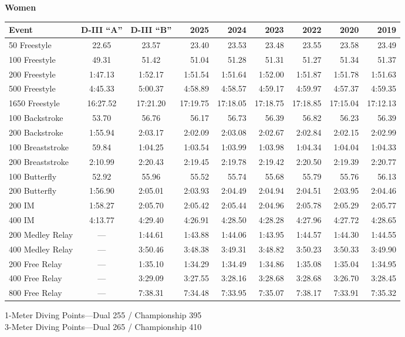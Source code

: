\textbf{Women}
\begin{table}[htbp]
\centering
\scriptsize
\begin{tabularx}{\textwidth}{lccrrrrrr}
\toprule
Event & D-III ``A'' & D-III ``B'' & 2025 & 2024 & 2023 & 2022 & 2020 & 2019 \\
\midrule
50 Freestyle & 22.65 & 23.57 & 23.40 & 23.53 & 23.48 & 23.55 & 23.58 & 23.49 \\
100 Freestyle & 49.31 & 51.42 & 51.04 & 51.28 & 51.31 & 51.27 & 51.34 & 51.37 \\
200 Freestyle & 1:47.13 & 1:52.17 & 1:51.54 & 1:51.64 & 1:52.00 & 1:51.87 & 1:51.78 & 1:51.63 \\
500 Freestyle & 4:45.33 & 5:00.37 & 4:58.89 & 4:58.57 & 4:59.17 & 4:59.97 & 4:57.37 & 4:59.35 \\
1650 Freestyle & 16:27.52 & 17:21.20 & 17:19.75 & 17:18.05 & 17:18.75 & 17:18.85 & 17:15.04 & 17:12.13 \\
100 Backstroke & 53.70 & 56.76 & 56.17 & 56.73 & 56.39 & 56.82 & 56.23 & 56.39 \\
200 Backstroke & 1:55.94 & 2:03.17 & 2:02.09 & 2:03.08 & 2:02.67 & 2:02.84 & 2:02.15 & 2:02.99 \\
100 Breaststroke & 59.84 & 1:04.25 & 1:03.54 & 1:03.99 & 1:03.98 & 1:04.34 & 1:04.04 & 1:04.33 \\
200 Breaststroke & 2:10.99 & 2:20.43 & 2:19.45 & 2:19.78 & 2:19.42 & 2:20.50 & 2:19.39 & 2:20.77 \\
100 Butterfly & 52.92 & 55.96 & 55.52 & 55.74 & 55.68 & 55.79 & 55.76 & 56.13 \\
200 Butterfly & 1:56.90 & 2:05.01 & 2:03.93 & 2:04.49 & 2:04.94 & 2:04.51 & 2:03.95 & 2:04.46 \\
200 IM & 1:58.27 & 2:05.70 & 2:05.42 & 2:05.44 & 2:04.96 & 2:05.78 & 2:05.29 & 2:05.77 \\
400 IM & 4:13.77 & 4:29.40 & 4:26.91 & 4:28.50 & 4:28.28 & 4:27.96 & 4:27.72 & 4:28.65 \\
200 Medley Relay & --- & 1:44.61 & 1:43.88 & 1:44.06 & 1:43.95 & 1:44.57 & 1:44.30 & 1:44.55 \\
400 Medley Relay & --- & 3:50.46 & 3:48.38 & 3:49.31 & 3:48.82 & 3:50.23 & 3:50.33 & 3:49.90 \\
200 Free Relay & --- & 1:35.10 & 1:34.29 & 1:34.49 & 1:34.86 & 1:35.08 & 1:35.04 & 1:34.95 \\
400 Free Relay & --- & 3:29.09 & 3:27.55 & 3:28.16 & 3:28.68 & 3:28.68 & 3:26.70 & 3:28.45 \\
800 Free Relay & --- & 7:38.31 & 7:34.48 & 7:33.95 & 7:35.07 & 7:38.17 & 7:33.91 & 7:35.32 \\
\bottomrule
\end{tabularx}

\vspace{0.5em}
\small{1-Meter Diving Points—Dual 255 / Championship 395 \\
3-Meter Diving Points—Dual 265 / Championship 410}
\end{table}
